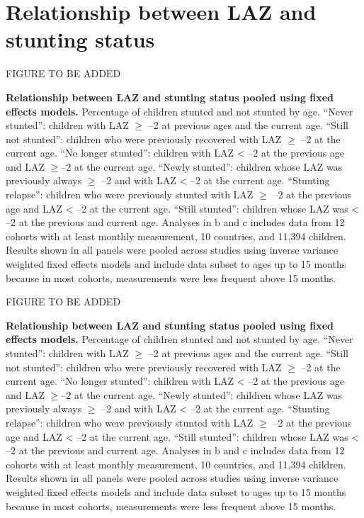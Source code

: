 \documentclass[9pt,]{book}
\begin{document}
\section{Relationship between LAZ and stunting
status}\label{relationship-between-laz-and-stunting-status}

FIGURE TO BE ADDED

\textbf{Relationship between LAZ and stunting status pooled using fixed
effects models.} Percentage of children stunted and not stunted by age.
``Never stunted'': children with LAZ \(\ge\) --2 at previous ages and
the current age. ``Still not stunted'': children who were previously
recovered with LAZ \(\ge\) --2 at the current age. ``No longer
stunted'': children with LAZ \textless{} --2 at the previous age and LAZ
\(\ge\)--2 at the current age. ``Newly stunted'': children whose LAZ was
previously always \(\ge\) --2 and with LAZ \textless{} --2 at the
current age. ``Stunting relapse'': children who were previously stunted
with LAZ \(\ge\) --2 at the previous age and LAZ \textless{} --2 at the
current age. ``Still stunted'': children whose LAZ was \textless{} --2
at the previous and current age. Analyses in b and c includes data from
12 cohorts with at least monthly measurement, 10 countries, and 11,394
children. Results shown in all panels were pooled across studies using
inverse variance weighted fixed effects models and include data subset
to ages up to 15 months because in most cohorts, measurements were less
frequent above 15 months.

FIGURE TO BE ADDED

\textbf{Relationship between LAZ and stunting status pooled using fixed
effects models.} Percentage of children stunted and not stunted by age.
``Never stunted'': children with LAZ \(\ge\) --2 at previous ages and
the current age. ``Still not stunted'': children who were previously
recovered with LAZ \(\ge\) --2 at the current age. ``No longer
stunted'': children with LAZ \textless{} --2 at the previous age and LAZ
\(\ge\)--2 at the current age. ``Newly stunted'': children whose LAZ was
previously always \(\ge\) --2 and with LAZ \textless{} --2 at the
current age. ``Stunting relapse'': children who were previously stunted
with LAZ \(\ge\) --2 at the previous age and LAZ \textless{} --2 at the
current age. ``Still stunted'': children whose LAZ was \textless{} --2
at the previous and current age. Analyses in b and c includes data from
12 cohorts with at least monthly measurement, 10 countries, and 11,394
children. Results shown in all panels were pooled across studies using
inverse variance weighted fixed effects models and include data subset
to ages up to 15 months because in most cohorts, measurements were less
frequent above 15 months.
\end{document}
